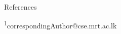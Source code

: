 \documentclass[final,dvipsnames]{beamer}
\newlength{\sepwidth}
\newlength{\colwidth}
\newcommand{\separatorcolumn}{\begin{column}{\sepwidth}\end{column}}
\newcommand*{\affmark}[1][*]{\textsuperscript{#1}}
\begin{document}
\begin{frame}[t]
\begin{columns}[t]
\begin{column}{\colwidth}
\begin{block}{References}
{\fontsize{1}{1} \selectfont 


}
\end{block}
{\small{}\hfill\affmark[1]correspondingAuthor@cse.mrt.ac.lk
}
\end{column}

\separatorcolumn
\end{columns}



\end{frame}
\end{document}
